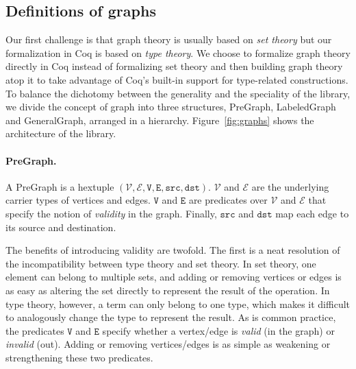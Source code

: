 \subsection{Definitions of graphs}\label{sec:mathinfra}


%


Our first challenge is that graph theory is usually based on
\emph{set theory} but our formalization in Coq is
based on \emph{type theory}. We choose to formalize graph theory
directly in Coq instead of formalizing set theory and then building
graph theory atop it to take advantage of Coq's built-in
support for type-related constructions.
To balance the dichotomy between
the generality and the speciality of the library, we divide the
concept of graph into three structures,
PreGraph, LabeledGraph and GeneralGraph, arranged in a hierarchy.
Figure~\ref{fig:graphs} shows the
architecture of the library.


\paragraph{PreGraph.}
A PreGraph is a hextuple $(\mathcal{V}, \mathcal{E}, \mathtt{V}, \mathtt{E}, \mathtt{src}, \mathtt{dst})$.  $\mathcal{V}$ and $\mathcal{E}$ are the underlying
carrier types of vertices and edges.  $\mathtt{V}$ and $\mathtt{E}$ are predicates over
$\mathcal{V}$ and $\mathcal{E}$ that specify the notion
of \emph{validity} in the graph.  Finally, $\mathtt{src}$ and $\mathtt{dst}$ map each edge to
its source and destination.

The benefits of introducing validity are twofold. The first is a
neat resolution of the incompatibility between type theory and set theory.
In set theory, one
element can belong to multiple sets, and
adding or removing vertices or edges is as easy as altering
the set directly to represent the result of the operation.
In type theory, however, a term can only belong
to one type, which makes it difficult
to analogously change the
type to represent the result. As is common practice, the
predicates $\mathtt{V}$ and $\mathtt{E}$ specify whether a vertex/edge is \emph{valid}
(in the graph) or \emph{invalid} (out). Adding or removing vertices/edges
is as simple as weakening or strengthening these two predicates.

